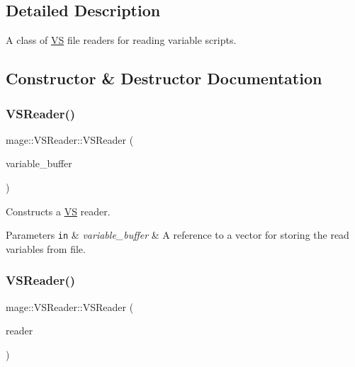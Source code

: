 \subsection{Detailed Description}
A class of \hyperlink{structmage_1_1_v_s}{VS} file readers for reading variable scripts. 

\subsection{Constructor \& Destructor Documentation}
\hypertarget{classmage_1_1_v_s_reader_ab41fb08f6e7a72b0ba7059ecb8c91623}{}\label{classmage_1_1_v_s_reader_ab41fb08f6e7a72b0ba7059ecb8c91623} 
\subsubsection{\texorpdfstring{V\+S\+Reader()}{VSReader()}\hspace{0.1cm}{\footnotesize\ttfamily [1/3]}}
{\footnotesize\ttfamily mage\+::\+V\+S\+Reader\+::\+V\+S\+Reader (\begin{DoxyParamCaption}\item[{vector$<$ \hyperlink{structmage_1_1_variable}{Variable} $>$ \&}]{variable\+\_\+buffer }\end{DoxyParamCaption})\hspace{0.3cm}{\ttfamily [explicit]}}

Constructs a \hyperlink{structmage_1_1_v_s}{VS} reader.


\begin{DoxyParams}[1]{Parameters}
\mbox{\tt in}  & {\em variable\+\_\+buffer} & A reference to a vector for storing the read variables from file. \\
\hline
\end{DoxyParams}
\hypertarget{classmage_1_1_v_s_reader_aec7ec2ea03d5d77c5e78438a60263a73}{}\label{classmage_1_1_v_s_reader_aec7ec2ea03d5d77c5e78438a60263a73} 
\subsubsection{\texorpdfstring{V\+S\+Reader()}{VSReader()}\hspace{0.1cm}{\footnotesize\ttfamily [2/3]}}
{\footnotesize\ttfamily mage\+::\+V\+S\+Reader\+::\+V\+S\+Reader (\begin{DoxyParamCaption}\item[{const \hyperlink{classmage_1_1_v_s_reader}{V\+S\+Reader} \&}]{reader }\end{DoxyParamCaption})\hspace{0.3cm}{\ttfamily [delete]}}


